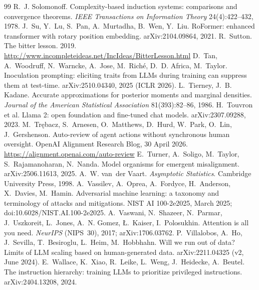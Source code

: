\begin{thebibliography}{99}
 R.~J. Solomonoff. Complexity-based induction systems: comparisons and convergence theorems. \emph{IEEE Transactions on Information Theory} 24(4):422--432, 1978.
 J.~Su, Y.~Lu, S.~Pan, A.~Murtadha, B.~Wen, Y.~Liu. RoFormer: enhanced transformer with rotary position embedding. arXiv:2104.09864, 2021.
 R.~Sutton. The bitter lesson. 2019. \url{http://www.incompleteideas.net/IncIdeas/BitterLesson.html}
 D.~Tan, A.~Woodruff, N.~Warncke, A.~Jose, M.~Rich\'e, D.~D. Africa, M.~Taylor. Inoculation prompting: eliciting traits from LLMs during training can suppress them at test-time. arXiv:2510.04340, 2025 (ICLR 2026).
 L.~Tierney, J.~B. Kadane. Accurate approximations for posterior moments and marginal densities. \emph{Journal of the American Statistical Association} 81(393):82--86, 1986.
 H.~Touvron et al. Llama 2: open foundation and fine-tuned chat models. arXiv:2307.09288, 2023.
 M.~Tr{\k e}bacz, S.~Arnesen, O.~Matthews, D.~Hurd, W.~Park, O.~Lin, J.~Gershenson. Auto-review of agent actions without synchronous human oversight. OpenAI Alignment Research Blog, 30 April 2026. \url{https://alignment.openai.com/auto-review}
 E.~Turner, A.~Soligo, M.~Taylor, S.~Rajamanoharan, N.~Nanda. Model organisms for emergent misalignment. arXiv:2506.11613, 2025.
 A.~W. van~der Vaart. \emph{Asymptotic Statistics}. Cambridge University Press, 1998.
 A.~Vassilev, A.~Oprea, A.~Fordyce, H.~Anderson, X.~Davies, M.~Hamin. Adversarial machine learning: a taxonomy and terminology of attacks and mitigations. NIST AI 100-2e2025, March 2025; doi:10.6028/NIST.AI.100-2e2025.
 A.~Vaswani, N.~Shazeer, N.~Parmar, J.~Uszkoreit, L.~Jones, A.~N. Gomez, {\L}.~Kaiser, I.~Polosukhin. Attention is all you need. \emph{NeurIPS} (NIPS~30), 2017; arXiv:1706.03762.
 P.~Villalobos, A.~Ho, J.~Sevilla, T.~Besiroglu, L.~Heim, M.~Hobbhahn. Will we run out of data? Limits of LLM scaling based on human-generated data. arXiv:2211.04325 (v2, June 2024).
 E.~Wallace, K.~Xiao, R.~Leike, L.~Weng, J.~Heidecke, A.~Beutel. The instruction hierarchy: training LLMs to prioritize privileged instructions. arXiv:2404.13208, 2024.

\end{thebibliography}
